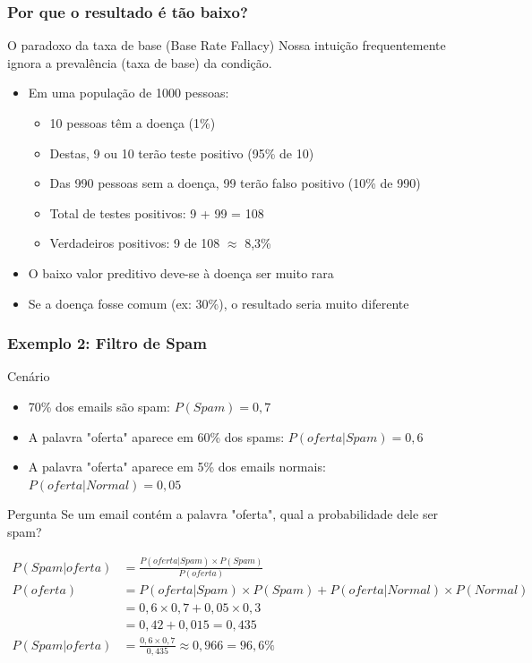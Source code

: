\documentclass[11pt]{beamer}
\begin{document}
\begin{frame}
\frametitle{Por que o resultado é tão baixo?}
\begin{block}{O paradoxo da taxa de base (Base Rate Fallacy)}
Nossa intuição frequentemente ignora a prevalência (taxa de base) da condição.
\end{block}

\begin{itemize}
\item Em uma população de 1000 pessoas:
  \begin{itemize}
  \item 10 pessoas têm a doença (1\%)
  \item Destas, 9 ou 10 terão teste positivo (95\% de 10)
  \item Das 990 pessoas sem a doença, 99 terão falso positivo (10\% de 990)
  \item Total de testes positivos: 9 + 99 = 108
  \item Verdadeiros positivos: 9 de 108 $\approx$ 8,3\%
  \end{itemize}
\item O baixo valor preditivo deve-se à doença ser muito rara
\item Se a doença fosse comum (ex: 30\%), o resultado seria muito diferente
\end{itemize}
\end{frame}

\begin{frame}
\frametitle{Exemplo 2: Filtro de Spam}
\begin{block}{Cenário}
\begin{itemize}
\item 70\% dos emails são spam: $P(Spam) = 0,7$
\item A palavra "oferta" aparece em 60\% dos spams: $P(oferta|Spam) = 0,6$
\item A palavra "oferta" aparece em 5\% dos emails normais: $P(oferta|Normal) = 0,05$
\end{itemize}
\end{block}

\begin{alertblock}{Pergunta}
Se um email contém a palavra "oferta", qual a probabilidade dele ser spam?
\end{alertblock}

\begin{align*}
P(Spam|oferta) &= \frac{P(oferta|Spam) \times P(Spam)}{P(oferta)} \\[8pt]
P(oferta) &= P(oferta|Spam) \times P(Spam) + P(oferta|Normal) \times P(Normal) \\
&= 0,6 \times 0,7 + 0,05 \times 0,3 \\
&= 0,42 + 0,015 = 0,435 \\[8pt]
P(Spam|oferta) &= \frac{0,6 \times 0,7}{0,435} \approx 0,966 = 96,6\%
\end{align*}
\end{frame}
\end{document}
